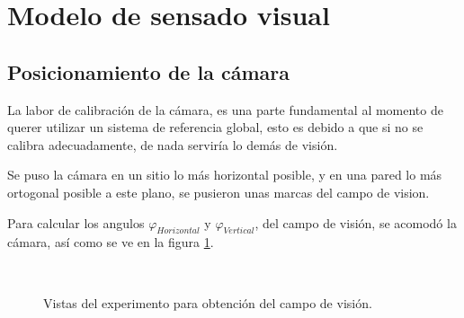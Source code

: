 \documentclass[spanish,10pt,letterpaper, twocolumn]{article}
\begin{document}
 


\section{Modelo de sensado visual}
\subsection{Posicionamiento de la c\'amara}
La labor de calibraci\'on de la c\'amara, es una parte fundamental al momento de querer utilizar un sistema de referencia global, esto es debido a que si no se calibra adecuadamente, de nada servir\'ia lo dem\'as de visi\'on.

Se puso la c\'amara en un sitio lo m\'as horizontal posible, y en una pared lo m\'as ortogonal posible a este plano, se pusieron unas marcas del campo de vision.

Para calcular los angulos $\varphi_{Horizontal}$ y $\varphi_{Vertical}$, del campo de visi\'on, se acomod\'o la c\'amara, as\'i como se ve en la figura \ref{vision:fig1}.


\begin{figure}[ht]
		\centering
		\\
		\caption{Vistas del experimento para obtenci\'on del campo de visi\'on.}
		\label{vision:fig1}
\end{figure}
\end{document}
